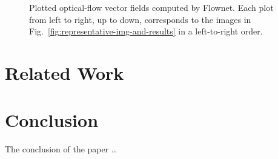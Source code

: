 \documentclass[journal]{IEEEtran}
\begin{document}
\begin{figure}
  \caption{Plotted optical-flow vector fields computed by Flownet. Each plot from left to right, up to down, corresponds to the images in Fig.~\ref{fig:representative-img-and-results} in a left-to-right order.}
  \label{fig:vector-fields}
\end{figure}

\section{Related Work}
\label{sec:related}

\section{Conclusion}
\label{sec:conclusion}
The conclusion of the paper \dots





\end{document}
